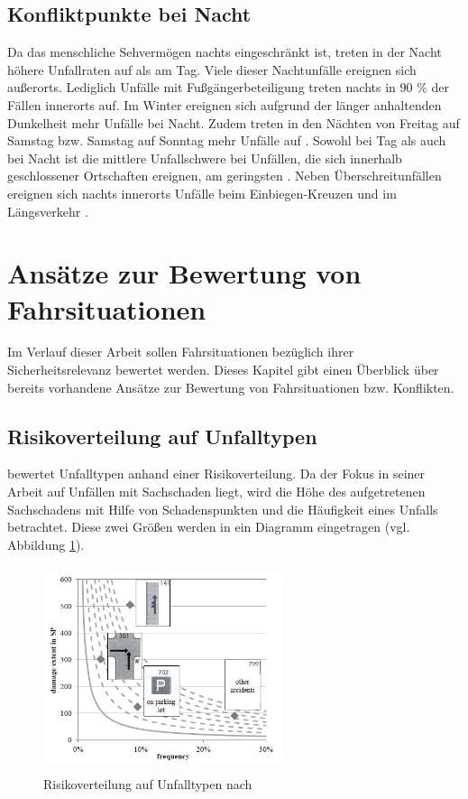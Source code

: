 \subsection{Konfliktpunkte bei Nacht}
Da das menschliche Sehvermögen nachts eingeschränkt ist, treten in der Nacht höhere Unfallraten auf als am Tag. Viele dieser Nachtunfälle ereignen sich außerorts. Lediglich Unfälle mit Fußgängerbeteiligung treten nachts in 90 \% der Fällen innerorts auf. Im Winter ereignen sich aufgrund der länger anhaltenden Dunkelheit mehr Unfälle bei Nacht. Zudem treten in den Nächten von Freitag auf Samstag bzw. Samstag auf Sonntag mehr Unfälle auf  \parencite[S. 12]{DEKRA.2017}. Sowohl bei Tag als auch bei Nacht ist die mittlere Unfallschwere bei Unfällen, die sich innerhalb geschlossener Ortschaften ereignen, am geringsten \parencite[S. 18]{DEKRA.2017}. Neben Überschreitunfällen ereignen sich nachts innerorts Unfälle beim Einbiegen-Kreuzen und im Längsverkehr \parencite[S. 26]{DEKRA.2017}.


\section{Ansätze zur Bewertung von Fahrsituationen}\label{section:Ansätze zur Bewertung von Fahrsituationen}
Im Verlauf dieser Arbeit sollen Fahrsituationen bezüglich ihrer Sicherheitsrelevanz bewertet werden. Dieses Kapitel gibt einen Überblick über bereits vorhandene Ansätze zur Bewertung von Fahrsituationen bzw. Konflikten. %

\subsection{Risikoverteilung auf Unfalltypen}\label{subsection:Risikoverteilung auf Unfalltypen}
\Textcite[S. 60]{Gschwendtner.2015} bewertet Unfalltypen anhand einer Risikoverteilung. Da der Fokus in seiner Arbeit auf Unfällen mit Sachschaden liegt, wird die Höhe des aufgetretenen Sachschadens mit Hilfe von Schadenspunkten und die Häufigkeit eines Unfalls betrachtet. Diese zwei Größen werden in ein Diagramm eingetragen (vgl. Abbildung \ref{fig:Risikoverteilung}).

\begin{savenotes}
	\begin{figure}[H]
		\centering
		\includegraphics[width=7cm,height=6cm]{figures/Risikoverteilung}
		\caption[Risikoverteilung auf Unfalltypen.]{Risikoverteilung auf Unfalltypen nach \parencite[S. 376]{Gschwendtner.2014}}\label{fig:Risikoverteilung}
	\end{figure}
\end{savenotes}


